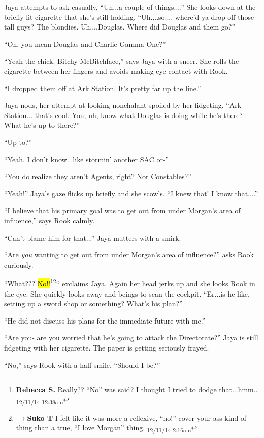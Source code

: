 Jaya attempts to ask casually, ``Uh...a  couple of things....'' She looks down at the briefly lit cigarette that she's still holding.  ``Uh....so....  where'd ya drop off those tall guys?  The blondies.  Uh....Douglas.  Where did Douglas and them go?''

``Oh, you mean Douglas and Charlie Gamma One?''

``Yeah the chick.  Bitchy McBitchface,'' says Jaya with a sneer.  She rolls the cigarette between her fingers and avoids making eye contact with Rook.

``I dropped them off at Ark Station. It's pretty far up the line.''

Jaya nods, her attempt at looking nonchalant spoiled by her fidgeting.  ``Ark Station... that's cool.  You, uh, know what Douglas is doing while he's there? What he's up to there?''

``Up to?''

``Yeah.  I don't know...like stormin' another SAC or-''

``You do realize they aren't Agents, right? Nor Constables?''

``Yeah!'' Jaya's gaze flicks up briefly and she scowls.  ``I knew that!  I know that....''

``I believe that his primary goal was to get out from under Morgan's area of influence,'' says Rook calmly.

``Can't blame him for that...'' Jaya mutters with a smirk.

``Are \textit{you} wanting to get out from under Morgan's area of influence?'' asks Rook curiously.

``What??? \hl{No!!}\footnote{\textbf{Rebecca S. }Really?? ``No'' was said? I thought I tried to dodge that...hmm.. \textsubscript{12/11/14 12:38am}}\footnote{$\rightarrow$\textbf{Suko T }I felt like it was more a reflexive, ``no!'' cover-your-ass kind of thing than a true, ``I love Morgan'' thing. \textsubscript{12/11/14 2:16am}}`` exclaims Jaya.  Again her head jerks up and she looks Rook in the eye.  She quickly looks away and beings to scan the cockpit.  ``Er...is he like, setting up a sword shop or something? What's his plan?''

``He did not discuss his plans for the immediate future with me.''

``Are you- are you worried that he's going to attack the Directorate?'' Jaya is still fidgeting with her cigarette.  The paper is getting seriously frayed.

``No,'' says Rook with a half smile.  ``Should I be?''

